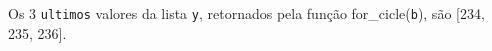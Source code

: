 \documentclass[12pt,varwidth=16cm,border=1pt]{standalone}
\begin{document}
Os 3 \verb+ultimos+ valores da lista \verb+y+, retornados pela função for\_cicle(\verb+b+), são [234, 235, 236].

\questiomtrue
\end{document}
